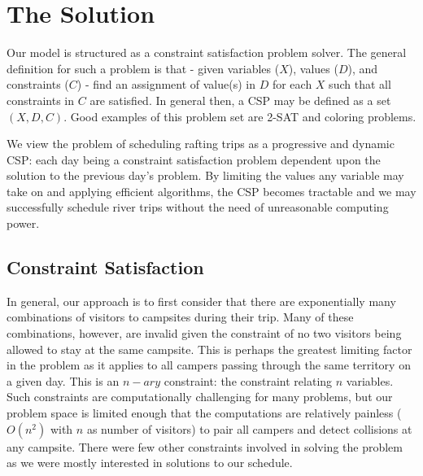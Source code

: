 \documentclass[11pt]{article} %
\begin{document}
\section{The Solution}
\label{sec:model-details}
Our model is structured as a constraint satisfaction problem solver.
The general definition
for such a problem is that - given variables ($X$), values ($D$),
and constraints ($C$) - find an assignment of value(s) in $D$
for each $X$ such that all constraints in $C$ are satisfied.  In general
then, a CSP may be defined as a set $(X,D,C)$.
Good examples of this problem set are 2-SAT and coloring problems\cite{DynamicCSP}.

We view the problem of scheduling rafting trips as a progressive and dynamic
CSP: each day being a constraint satisfaction problem dependent upon the
solution to the previous day's problem.  By limiting the values any variable
may take on and applying efficient algorithms, the CSP becomes tractable and
we may successfully schedule river trips without the need of unreasonable
computing power.

\subsection{Constraint Satisfaction}
\label{sec:csp}

In general, our approach is to first consider that there are exponentially
many combinations of  visitors to campsites during their trip.  Many of
these combinations, however, are invalid given the constraint of no two
 visitors being allowed to stay at the same campsite.  This is perhaps
the greatest limiting factor in the problem as it applies to all campers
passing through the same territory on a given day.  This is an $n-ary$
constraint: the constraint relating $n$ variables.  Such constraints are
computationally challenging for many problems, but our problem space is limited
enough that the computations are relatively painless ($O(n^2)$ with $n$ as
number of  visitors) to pair all campers and detect collisions at any
campsite.  There were few other constraints involved in solving the problem
as we were mostly interested in solutions to our schedule.
\end{document}
